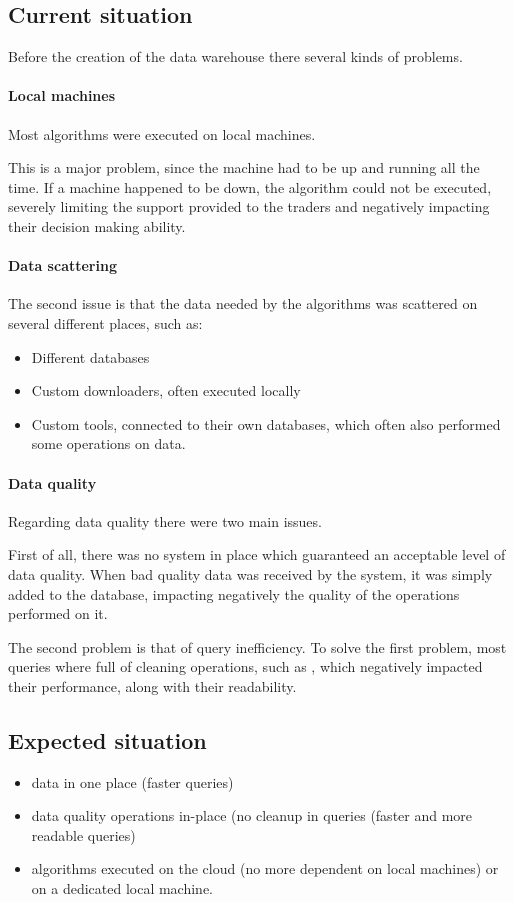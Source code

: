 \subsection{Current situation}
    Before the creation of the data warehouse there several kinds of problems.
    
    \paragraph{Local machines}
        Most algorithms were executed on local machines.
        
        This is a major problem, since the machine had to be up and running all the time.
        If a machine happened to be down, the algorithm could not be executed, severely limiting the support provided to the traders and negatively impacting their decision making ability.
    \paragraph{Data scattering}
        The second issue is that the data needed by the algorithms was scattered on several different places, such as:
        \begin{itemize}
            \item Different databases
            \item Custom downloaders, often executed locally
            \item Custom tools, connected to their own databases, which often also performed some operations on data.
        \end{itemize}
    \paragraph{Data quality}
        Regarding data quality there were two main issues.
        
        First of all, there was no system in place which guaranteed an acceptable level of data quality.
        When bad quality data was received by the system, it was simply added to the database, impacting negatively the quality of the operations performed on it.
        
        The second problem is that of query inefficiency.
        To solve the first problem, most queries where full of cleaning operations, such as , which negatively impacted their performance, along with their readability.
        
\subsection{Expected situation}
    \begin{itemize}
        \item data in one place (faster queries)
        \item data quality operations in-place (no cleanup in queries (faster and more readable queries)
        \item algorithms executed on the cloud (no more dependent on local machines) or on a dedicated local machine.
    \end{itemize}